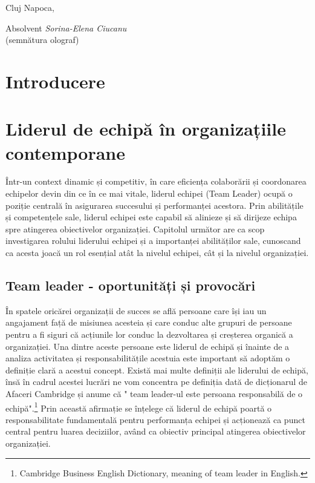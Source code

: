 \documentclass[a4paper, 12pt]{article}
\begin{document}
\vspace{3 cm}
\begin{flushleft}
	\large Cluj Napoca,
\end{flushleft}


\begin{flushright}
	\hfill \large Absolvent \textit{Sorina-Elena Ciucanu} \\
	\hfill \large {(semnătura olograf)}
\end{flushright}
\newpage
\thispagestyle{empty}
\tableofcontents
\thispagestyle{empty}
\newpage
\thispagestyle{empty}
\listoffigures
\newpage
\thispagestyle{empty}
\listoftables


\newpage



	\section*{Introducere}

\newpage
	\setcounter{section}{0}
	\section{Liderul de echipă în organizațiile contemporane}
\quad \quad\space Într-un context dinamic și competitiv, în care eficiența colaborării și coordonarea echipelor devin din ce în ce mai vitale, liderul echipei (Team Leader) ocupă o poziție centrală în asigurarea succesului și performanței acestora. Prin abilitățile și competențele sale, liderul echipei este capabil să alinieze și să dirijeze echipa spre atingerea obiectivelor organizației. Capitolul următor are ca scop investigarea rolului liderului echipei și a importanței abilităților sale, cunoscand ca acesta joacă un rol esențial atât la nivelul echipei, cât și la nivelul organizației.
		\subsection{ Team leader - oportunități și provocări}

\quad\quad\space În spatele oricărei organizații de succes se află persoane care își iau un angajament față de misiunea acesteia și care conduc alte grupuri de persoane pentru a fi siguri că acțiunile lor conduc la dezvoltarea și creșterea organică a organizației. Una dintre aceste persoane este liderul de echipă și înainte de a analiza activitatea și responsabilitățile acestuia este important să adoptăm o definiție clară a acestui concept. Există mai multe definiții ale liderului de echipă, însă în cadrul acestei lucrări ne vom concentra pe definiția dată de dicționarul de Afaceri Cambridge și anume că " team leader-ul  este persoana responsabilă de o echipă".\footnote{Cambridge Business English Dictionary, meaning of team leader in English.} Prin această afirmație se înțelege că liderul de echipă poartă o responsabilitate fundamentală pentru performanța echipei și acționează ca punct central pentru luarea deciziilor, având ca obiectiv principal atingerea obiectivelor organizației.
\end{document}
